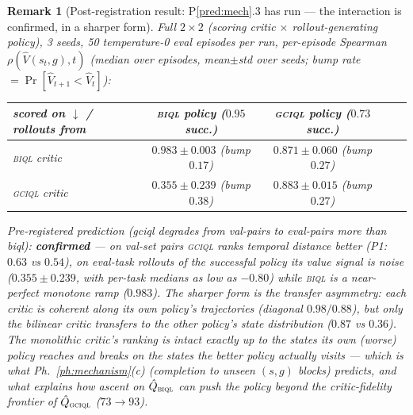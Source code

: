 \documentclass[10pt]{article}
\newtheorem{remark}{Remark}
\begin{document}
\begin{remark}[Post-registration result: P\ref{pred:mech}.3 has run --- the interaction is
confirmed, in a sharper form]\label{rem:p2}
Full $2\times2$ (scoring critic $\times$ rollout-generating policy), 3 seeds, 50
temperature-0 eval episodes per run, per-episode Spearman $\rho(\hat V(s_t,g),t)$
(median over episodes, mean$\pm$std over seeds; bump rate $=\Pr[\hat V_{t+1}<\hat V_t]$):
\begin{center}
\begin{tabular}{lcccc}
\toprule
scored on $\downarrow$ / rollouts from & \textsc{biql} policy ($0.95$ succ.) & \textsc{gciql} policy ($0.73$ succ.)\\
\midrule
\textsc{biql} critic  & $0.983\pm0.003$ \;(bump $0.17$) & $0.871\pm0.060$ \;(bump $0.27$)\\
\textsc{gciql} critic & $\mathbf{0.355\pm0.239}$ \;(bump $0.38$) & $0.883\pm0.015$ \;(bump $0.27$)\\
\bottomrule
\end{tabular}
\end{center}
Pre-registered prediction (gciql degrades from val-pairs to eval-pairs more than biql):
\textbf{confirmed} --- on val-set pairs \textsc{gciql} ranks temporal distance \emph{better}
(P1: $0.63$ vs $0.54$), on eval-task rollouts of the successful policy its value signal is
noise ($0.355\pm0.239$, with per-task medians as low as $-0.80$) while \textsc{biql} is a
near-perfect monotone ramp ($0.983$). The sharper form is the \emph{transfer asymmetry}:
each critic is coherent along its own policy's trajectories (diagonal $0.98/0.88$), but
only the bilinear critic transfers to the \emph{other} policy's state distribution
($0.87$ vs $0.36$). The monolithic critic's ranking is intact exactly up to the states its
own (worse) policy reaches and breaks on the states the better policy actually visits ---
which is what Ph.~\ref{ph:mechanism}(c) (completion to unseen $(s,g)$ blocks) predicts, and
what explains how ascent on $\hat Q_{\textsc{biql}}$ can push the policy \emph{beyond} the
critic-fidelity frontier of $\hat Q_{\textsc{gciql}}$ ($73\to93$).
\end{remark}
\end{document}
